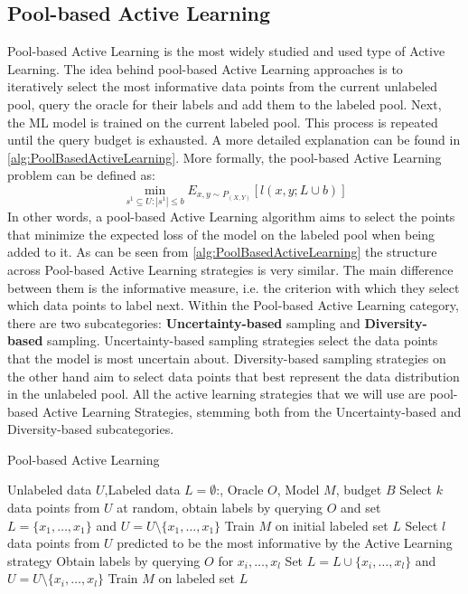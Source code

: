 \subsection{Pool-based Active Learning}
\label{sec:PoolBasedActiveLearning}
Pool-based Active Learning is the most widely studied and used type of Active Learning. The idea behind pool-based Active Learning approaches
is to iteratively select the most informative data points from the current unlabeled pool, query the oracle for their labels and add them to the
labeled pool. Next, the ML model is trained on the current labeled pool. This process is repeated until the query budget is exhausted. A more detailed
explanation can be found in \ref{alg:PoolBasedActiveLearning}. More formally, the pool-based Active Learning problem can be defined as:
\begin{equation}
    \min_{s^1 \subseteq U: |s^1| \leq b} E_{x,y \sim P_{(X,Y)}}[l(x,y;L \cup b)]
\end{equation}
In other words, a pool-based Active Learning algorithm aims to select the points that minimize the expected loss of the model on the labeled pool when
being added to it. As can be seen from  \ref{alg:PoolBasedActiveLearning} the structure across Pool-based Active Learning strategies is very similar.
The main difference between them is the informative measure, i.e. the criterion with which they select which data points to label next. Within the 
Pool-based Active Learning category, there are two subcategories: \textbf{Uncertainty-based} sampling and \textbf{Diversity-based} sampling. 
Uncertainty-based sampling strategies select the data points that the model is most uncertain about. Diversity-based sampling strategies on the other
hand aim to select data points that best represent the data distribution in the unlabeled pool. All the active learning strategies that we will use
are pool-based Active Learning Strategies, stemming both from the Uncertainty-based and Diversity-based subcategories.

\begin{algorithm}
    \caption{Pool-based Active Learning} \label{alg:PoolBasedActiveLearning}
    \begin{algorithmic}[1]
        \Require Unlabeled data $U$,Labeled data $L = \emptyset$:, Oracle $O$, Model $M$, budget $B$
        \State Select $k$ data points from $U$ at random, obtain labels by querying $O$ and set $L=\{x_1,\ldots,x_1\}$
        and $U = U \setminus \{x_1,\ldots,x_1\}$ 
        \State Train $M$ on initial labeled set $L$
            \State Select $l$ data points from $U$ predicted to be the most informative by the Active Learning strategy
            \State Obtain labels by querying $O$ for $x_i,\ldots,x_l$
            \State Set $L= L \cup \{x_i,\ldots,x_l\}$ and $U = U \setminus \{x_i,\ldots,x_l\}$
            \State Train $M$ on labeled set $L$
        \EndWhile
    \end{algorithmic}
\end{algorithm}

